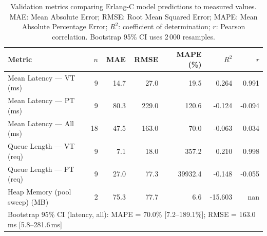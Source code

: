 \begin{table}[ht]
\centering
\caption{Validation metrics comparing Erlang-C model predictions to measured values. MAE: Mean Absolute Error; RMSE: Root Mean Squared Error; MAPE: Mean Absolute Percentage Error; $R^2$: coefficient of determination; $r$: Pearson correlation. Bootstrap 95\% CI uses 2\,000 resamples.}
\label{tab:validation}
\begin{tabular}{lrrrrrr}
\toprule
\textbf{Metric} & $n$ & MAE & RMSE & MAPE (\%) & $R^2$ & $r$ \\
\midrule
  Mean Latency — VT (ms) & 9 & 14.7 & 27.0 & 19.5 & 0.264 & 0.991 \\
  Mean Latency — PT (ms) & 9 & 80.3 & 229.0 & 120.6 & -0.124 & -0.094 \\
  Mean Latency — All (ms) & 18 & 47.5 & 163.0 & 70.0 & -0.063 & 0.034 \\
  Queue Length — VT (req) & 9 & 7.1 & 18.0 & 357.2 & 0.210 & 0.998 \\
  Queue Length — PT (req) & 9 & 27.0 & 77.3 & 39932.4 & -0.148 & -0.055 \\
  Heap Memory (pool sweep) (MB) & 2 & 75.3 & 77.7 & 6.6 & -15.603 & nan \\
\midrule
\multicolumn{7}{l}{\footnotesize Bootstrap 95\% CI (latency, all): MAPE = 70.0\% [7.2--189.1\%]; RMSE = 163.0\,ms [5.8--281.6\,ms]} \\
\bottomrule
\end{tabular}
\end{table}